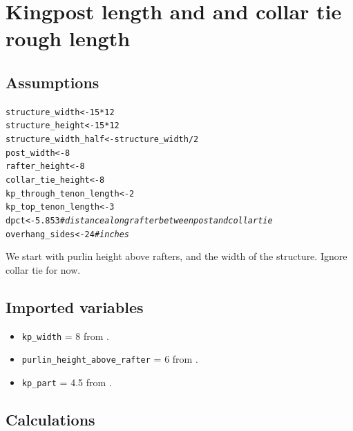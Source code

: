 \documentclass{article}\usepackage[]{graphicx}\usepackage[]{xcolor}
\makeatletter
\newcommand{\hlnum}[1]{\textcolor[rgb]{0.686,0.059,0.569}{#1}}%
\newcommand{\hlcom}[1]{\textcolor[rgb]{0.678,0.584,0.686}{\textit{#1}}}%
\newcommand{\hlopt}[1]{\textcolor[rgb]{0,0,0}{#1}}%
\newcommand{\hlstd}[1]{\textcolor[rgb]{0.345,0.345,0.345}{#1}}%
\newcommand{\hlkwb}[1]{\textcolor[rgb]{0.69,0.353,0.396}{#1}}%
\newenvironment{kframe}{%
 \def\at@end@of@kframe{}%
 \ifinner\ifhmode%
  \def\at@end@of@kframe{\end{minipage}}%
  \begin{minipage}{\columnwidth}%
 \fi\fi%
 \def\FrameCommand##1{\hskip\@totalleftmargin \hskip-\fboxsep
 \colorbox{shadecolor}{##1}\hskip-\fboxsep
     \hskip-\linewidth \hskip-\@totalleftmargin \hskip\columnwidth}%
 \MakeFramed {\advance\hsize-\width
   \@totalleftmargin\z@ \linewidth\hsize
   \@setminipage}}%
 {\par\unskip\endMakeFramed%
 \at@end@of@kframe}
\newenvironment{knitrout}{}{} %
\makeatother
\begin{document}
\section{Kingpost length and and collar tie rough length}\label{kp-and-collar-tie-lengths}

\subsection{Assumptions} \label{kp-collar-tie-assumptions}


\begin{knitrout}
\color{fgcolor}\begin{kframe}
\begin{alltt}
\hlstd{structure_width} \hlkwb{<-} \hlnum{15}\hlopt{*}\hlnum{12}
\hlstd{structure_height} \hlkwb{<-} \hlnum{15}\hlopt{*}\hlnum{12}
\hlstd{structure_width_half} \hlkwb{<-} \hlstd{structure_width}\hlopt{/}\hlnum{2}
\hlstd{post_width} \hlkwb{<-} \hlnum{8}
\hlstd{rafter_height} \hlkwb{<-} \hlnum{8}
\hlstd{collar_tie_height} \hlkwb{<-} \hlnum{8}
\hlstd{kp_through_tenon_length} \hlkwb{<-} \hlnum{2}
\hlstd{kp_top_tenon_length} \hlkwb{<-} \hlnum{3}
\hlstd{dpct} \hlkwb{<-} \hlnum{5.853} \hlcom{# distance along rafter between post and collar tie}
\hlstd{overhang_sides} \hlkwb{<-} \hlnum{24} \hlcom{# inches}
\end{alltt}
\end{kframe}
\end{knitrout}
We start with purlin height above rafters, and the width of the structure. Ignore collar tie for now.

\subsection{Imported variables} \label{kp-collar-tie-imported-variables}

\begin{itemize}
  \item \verb+kp_width+ = 8 from .
  \item \verb+purlin_height_above_rafter+ = 6 from .
  \item \verb+kp_part+ = 4.5 from .
\end{itemize}

\subsection{Calculations} \label{kp-collar-tie-calculations}
\end{document}
